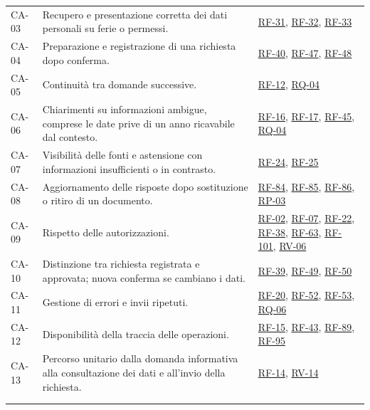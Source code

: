 \documentclass[documento]{gpt}
\begin{document}
{\begin{longtable}{@{}p{2.6cm}>{\raggedright\arraybackslash}p{7.0cm}>{\raggedright\arraybackslash}p{5.2cm}@{}}
\mbox{CA-03} & Recupero e presentazione corretta dei dati personali su ferie o permessi. & \hyperlink{req:RF-31}{RF-31}, \hyperlink{req:RF-32}{RF-32}, \hyperlink{req:RF-33}{RF-33} \\
\mbox{CA-04} & Preparazione e registrazione di una richiesta dopo conferma. & \hyperlink{req:RF-40}{RF-40}, \hyperlink{req:RF-47}{RF-47}, \hyperlink{req:RF-48}{RF-48} \\
\mbox{CA-05} & Continuità tra domande successive. & \hyperlink{req:RF-12}{RF-12}, \hyperlink{req:RQ-04}{RQ-04} \\
\mbox{CA-06} & Chiarimenti su informazioni ambigue, comprese le date prive di un anno ricavabile dal contesto. & \hyperlink{req:RF-16}{RF-16}, \hyperlink{req:RF-17}{RF-17}, \hyperlink{req:RF-45}{RF-45}, \hyperlink{req:RQ-04}{RQ-04} \\
\mbox{CA-07} & Visibilità delle fonti e astensione con informazioni insufficienti o in contrasto. & \hyperlink{req:RF-24}{RF-24}, \hyperlink{req:RF-25}{RF-25} \\
\mbox{CA-08} & Aggiornamento delle risposte dopo sostituzione o ritiro di un documento. & \hyperlink{req:RF-84}{RF-84}, \hyperlink{req:RF-85}{RF-85}, \hyperlink{req:RF-86}{RF-86}, \hyperlink{req:RP-03}{RP-03} \\
\mbox{CA-09} & Rispetto delle autorizzazioni. & \hyperlink{req:RF-02}{RF-02}, \hyperlink{req:RF-07}{RF-07}, \hyperlink{req:RF-22}{RF-22}, \hyperlink{req:RF-38}{RF-38}, \hyperlink{req:RF-63}{RF-63}, \hyperlink{req:RF-101}{RF-101}, \hyperlink{req:RV-06}{RV-06} \\
\mbox{CA-10} & Distinzione tra richiesta registrata e approvata; nuova conferma se cambiano i dati. & \hyperlink{req:RF-39}{RF-39}, \hyperlink{req:RF-49}{RF-49}, \hyperlink{req:RF-50}{RF-50} \\
\mbox{CA-11} & Gestione di errori e invii ripetuti. & \hyperlink{req:RF-20}{RF-20}, \hyperlink{req:RF-52}{RF-52}, \hyperlink{req:RF-53}{RF-53}, \hyperlink{req:RQ-06}{RQ-06} \\
\mbox{CA-12} & Disponibilità della traccia delle operazioni. & \hyperlink{req:RF-15}{RF-15}, \hyperlink{req:RF-43}{RF-43}, \hyperlink{req:RF-89}{RF-89}, \hyperlink{req:RF-95}{RF-95} \\
\mbox{CA-13} & Percorso unitario dalla domanda informativa alla consultazione dei dati e all'invio della richiesta. & \hyperlink{req:RF-14}{RF-14}, \hyperlink{req:RV-14}{RV-14} \\
\addlinespace
\multicolumn{3}{@{}l}{\textbf{Altre fonti}} \\ \addlinespace[2pt]

\end{longtable}}
\end{document}
